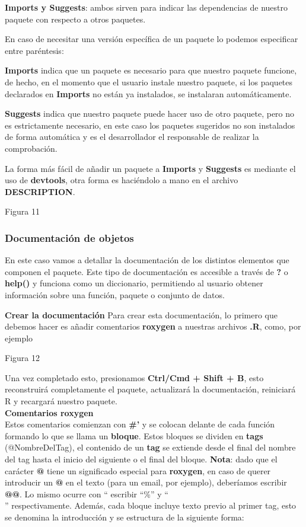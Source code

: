 \textbf{Imports y Suggests}: ambos sirven para indicar las dependencias de nuestro paquete con
respecto a otros paquetes.

En caso de necesitar una versi\'on espec\'ifica de un paquete lo podemos especificar entre
par\'entesis:

\textbf{Imports} indica que un paquete es necesario para que nuestro paquete funcione, de hecho,
en el momento que el usuario instale nuestro paquete, si los paquetes declarados en \textbf{Imports}
no est\'an ya instalados, se instalaran autom\'aticamente.

\textbf{Suggests} indica que nuestro paquete puede hacer uso de otro paquete, pero no es
estrictamente necesario, en este caso los paquetes sugeridos no son instalados de forma
autom\'atica y es el desarrollador el responsable de realizar la comprobaci\'on.

La forma m\'as f\'acil de a\~nadir un paquete a \textbf{Imports} y \textbf{Suggests} es mediante el uso de
\textbf{devtools}, otra forma es haci\'endolo a mano en el archivo \textbf{DESCRIPTION}.

Figura 11

\subsubsection{Documentaci\'on de objetos}

En este caso vamos a detallar la documentaci\'on de los distintos elementos que componen el
paquete.
Este tipo de documentaci\'on es accesible a trav\'es de \textbf{?} o \textbf{help()} y funciona como un
diccionario, permitiendo al usuario obtener informaci\'on sobre una funci\'on, paquete o conjunto
de datos.

\textbf{Crear la documentaci\'on}
Para crear esta documentaci\'on, lo primero que debemos hacer es a\~nadir comentarios
\textbf{roxygen} a nuestras archivos \textbf{.R}, como, por ejemplo

Figura 12

Una vez completado esto, presionamos \textbf{Ctrl/Cmd + Shift + B}, esto reconstruir\'a
completamente el paquete, actualizar\'a la documentaci\'on, reiniciar\'a R y recargar\'a nuestro
paquete. \\

\textbf{Comentarios roxygen} \\
Estos comentarios comienzan con \textbf{\#'} y se colocan delante de cada funci\'on formando lo que
se llama un \textbf{bloque}. Estos bloques se dividen en \textbf{tags} (@NombreDelTag), el contenido de un
\textbf{tag} se extiende desde el final del nombre del tag hasta el inicio del siguiente o el final del
bloque.
\textbf{Nota}: dado que el car\'acter \textbf{@} tiene un significado especial para \textbf{roxygen}, en caso de querer
introducir un \textbf{@} en el texto (para un email, por ejemplo), deber\'iamos escribir \textbf{@@}. Lo mismo
ocurre con “%
escribir “\%” y “\\” respectivamente.
Adem\'as, cada bloque incluye texto previo al primer tag, esto se denomina la introducci\'on y
se estructura de la siguiente forma:

